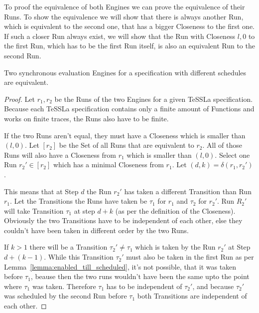 To proof the equivalence of both Engines we can prove the equivalence of their Runs.
To show the equivalence we will show that there is always another Run, which is equivalent to the second one, that has a bigger Closeness to the first one.
If such a closer Run always exist, we will show that the Run with Closeness \(l, 0\) to the first Run, which has to be the first Run itself, is also an equivalent Run to the second Run.

\begin{theorem}[name = Equivalence of different synchronous evaluation Engines]\label{theorem:equivalence_sync_eval_engines}
  Two synchronous evaluation Engines for a specification with different schedules are equivalent.
\end{theorem}
\begin{proof}

Let \(r_1, r_2\) be the Runs of the two Engines for a given TeSSLa specification.
Because each TeSSLa specification contains only a finite amount of Functions and works on finite traces, the Runs also have to be finite.

If the two Runs aren't equal, they must have a Closeness which is smaller than \((l, 0)\).
Let \([r_2]\) be the Set of all Runs that are equivalent to \(r_2\).
All of those Runs will also have a Closeness from \(r_1\) which is smaller than \((l, 0)\).
Select one Run \(r_2' \in [r_2]\) which has a minimal Closeness from \(r_1\).
Let \((d,k) = \delta(r_1, r_2')\).

This means that at Step \(d\) the Run \(r_2'\) has taken a different Transition than Run \(r_1\).
Let the Transitions the Runs have taken be \(\tau_1\) for \(r_1\) and \(\tau_2\) for \(r_2'\).
Run \(R_2'\) will take Transition \(\tau_1\) at step \(d+k\) (as per the definition of the Closeness).
Obviously the two Transitions have to be independent of each other, else they couldn't have been taken in different order by the two Runs.

If \(k > 1\) there will be a Transition \(\tau_2' \neq \tau_1\) which is taken by the Run \(r_2'\) at Step \(d+(k-1)\).
While this Transition \(\tau_2'\) must also be taken in the first Run as per Lemma~\ref{lemma:enabled_till_scheduled}, it's not possible, that it was taken before \(\tau_1\), beause then the two runs wouldn't have been the same upto the point where \(\tau_1\) was taken.
Therefore \(\tau_1\) has to be independent of \(\tau_2'\), and because \(\tau_2'\) was scheduled by the second Run before \(\tau_1\) both Transitions are independent of each other.


\end{proof}
